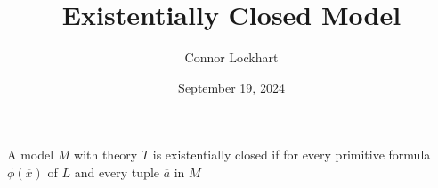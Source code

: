 \documentclass[a4paper]{article}
\title{Existentially Closed Model}
\date{September 19, 2024}
\author{Connor Lockhart}
\begin{document}
\maketitle
\par{ A model \(M\) with theory \(T\) is existentially closed if for every primitive formula \(\phi ( \overline {x})\) of \(L\) and every tuple \(\overline {a}\) in \(M\)}
\printbibliography
\end{document}
